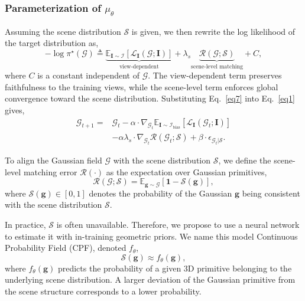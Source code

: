 \documentclass[lettersize,journal]{IEEEtran}
\begin{document}
\subsubsection{Parameterization of $\mu_{\theta}$}

Assuming the scene distribution $\mathcal{S}$ is given, we then rewrite the log likelihood of the target distribution as, 
\begin{equation}
    -\log \pi^{\star} (\mathcal{G}) \triangleq \underbrace{\mathbb{E}_{\mathbf{I}\sim\mathcal{I}}\!\left[\mathcal{L}_{\mathbf{I}}(\mathcal{G};\mathbf{I})\right]}_{\text{view-dependent}}
    + \lambda_{s} \underbrace{\mathcal{R}(\mathcal{G};\mathcal{S})}_{\text{scene-level matching}} + C,
    \label{eq7}
\end{equation}
where $C$ is a constant independent of $\mathcal{G}$. The view-dependent term preserves faithfulness to the training views, while the scene-level term enforces global convergence toward the scene distribution. Substituting Eq.~\ref{eq7} into Eq.~\ref{eq1} gives, 
\begin{equation}
    \begin{aligned}
    \mathcal{G}_{t+1} = &\mathcal{G}_t - \alpha \cdot \nabla_{\mathcal{G}_t} \mathbb{E}_{\mathbf{I}\sim\mathcal{I}_{\text{bias}}}\!\left[\mathcal{L}_{\mathbf{I}}(\mathcal{G}_t;\mathbf{I})\right] \\
    &- \alpha \lambda_s \cdot \nabla_{\mathcal{G}_t} \mathcal{R}(\mathcal{G}_t;\mathcal{S}) + \beta \cdot \epsilon_{\mathcal{G}_t \vert \mathcal{S}}.
    \end{aligned}
    \label{eq8}
\end{equation} 

To align the Gaussian field $\mathcal{G}$ with the scene distribution $\mathcal{S}$, we define the scene-level matching error $\mathcal{R}(\cdot)$ as the expectation over Gaussian primitives, 
\begin{equation}
    \mathcal{R}(\mathcal{G};\mathcal{S}) = \mathbb{E}_{\mathbf{g} \sim \mathcal{G}} \left[ \mathbf{1} - \mathcal{S} (\mathbf{g}) \right],
    \label{eq9}
\end{equation}
where $\mathcal{S} (\mathbf{g}) \in [0, 1]$ denotes the probability of the Gaussian $\mathbf{g}$ being consistent with the scene distribution $\mathcal{S}$.

In practice, $\mathcal{S}$ is often unavailable. Therefore, we propose to use a neural network to estimate it with in-training geometric priors. We name this model Continuous Probability Field (CPF), denoted $f_{\theta}$, 
\begin{equation}
    \mathcal{S}(\mathbf{g}) \approx f_{\theta}(\mathbf{g}), 
    \label{eq10}
\end{equation}
where $f_{\theta}(\mathbf{g})$ predicts the probability of a given 3D primitive belonging to the underlying scene distribution. 
A larger deviation of the Gaussian primitive from the scene structure corresponds to a lower probability.
\end{document}
